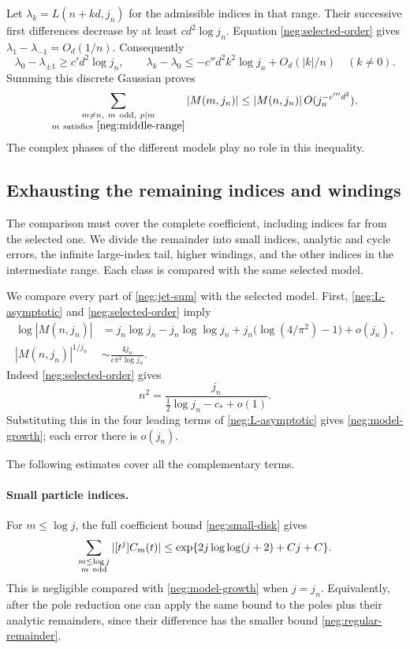 \documentclass[11pt]{article}
\numberwithin{equation}{section}
\theoremstyle{definition}
\begin{document}
Let \(\lambda_k=L(n+kd,j_n)\) for the admissible indices
in that range.  Their successive first differences decrease
by at least \(c d^2\log j_n\).  Equation
\eqref{neg:selected-order} gives
\(\lambda_1-\lambda_{-1}=O_d(1/n)\).
Consequently
\[
 \lambda_0-\lambda_{\pm1}\ge c'd^2\log j_n,
 \qquad
 \lambda_k-\lambda_0
       \le-c''d^2 k^2\log j_n+O_d(|k|/n)\quad(k\ne0).
 \]
Summing this discrete Gaussian proves
\begin{equation}
 \sum_{\substack{m\ne n,\ m\ {\rm odd},\ p\mid m\\
                         m\ {\rm satisfies}\ \eqref{neg:middle-range}}}
       |M(m,j_n)|
 \le |M(n,j_n)|\,O(j_n^{-c'''d^2}).
 \label{neg:single-index}
\end{equation}
The complex phases of the different models play no role in
this inequality.

\subsection{Exhausting the remaining indices and windings}
\label{neg:exhaustion}

The comparison must cover the complete coefficient, including
indices far from the selected one. We divide the remainder into
small indices, analytic and cycle errors, the infinite large-index
tail, higher windings, and the other indices in the intermediate
range. Each class is compared with the same selected model.

We compare every part of \eqref{neg:jet-sum} with the selected
model.  First, \eqref{neg:L-asymptotic} and
\eqref{neg:selected-order} imply
\begin{align}
 \log|M(n,j_n)|
 &=j_n\log j_n-j_n\log\log j_n
          +j_n\bigl(\log(4/\pi^2)-1\bigr)+o(j_n),
 \label{neg:model-growth}\\
 |M(n,j_n)|^{1/j_n}
 &\sim\frac{4j_n}{e\pi^2\log j_n}.
 \label{neg:model-root}
\end{align}
Indeed \eqref{neg:selected-order} gives
\[
 n^2=\frac{j_n}{\tfrac12\log j_n-c_*+o(1)}.
 \]
Substituting this in the four leading terms of
\eqref{neg:L-asymptotic} gives \eqref{neg:model-growth};
each error there is \(o(j_n)\).

The following estimates cover all the complementary terms.

\paragraph{Small particle indices.}
For \(m\le\log j\), the full coefficient bound
\eqref{neg:small-disk} gives
\begin{equation}
 \sum_{\substack{m\le\log j\\m\ {\rm odd}}}
       |[t^j]C_m(t)|
 \le \exp\{2j\log\log(j+2)+Cj+C\}.
 \label{neg:small-indices}
\end{equation}
This is negligible compared with \eqref{neg:model-growth}
when \(j=j_n\).  Equivalently, after the pole reduction one
can apply the same bound to the poles plus their analytic
remainders, since their difference has the smaller bound
\eqref{neg:regular-remainder}.
\end{document}
